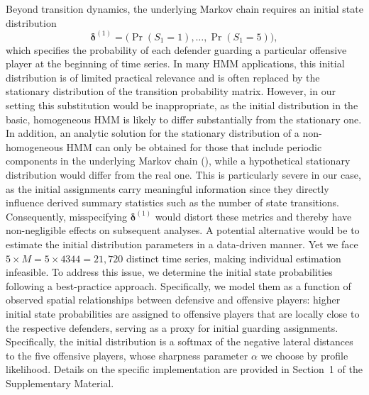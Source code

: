 \documentclass[namedate,webpdf,modern,medium]{oup-authoring-template}
\begin{document}

Beyond transition dynamics, the underlying Markov chain requires an initial state distribution 
$$\boldsymbol{\delta}^{(1)} = \bigl( \Pr(S_1=1), \ldots, \Pr(S_1=5) \bigr),$$ which specifies the probability of each defender guarding a particular offensive player at the beginning of time series. In many HMM applications, this initial distribution is of limited practical relevance and is often replaced by the stationary distribution of the transition probability matrix.
However, in our setting this substitution would be inappropriate, as the initial distribution in the basic, homogeneous HMM is likely to differ substantially from the stationary one. In addition, an analytic solution for the stationary distribution of a non-homogeneous HMM can only be obtained for those that include periodic components in the underlying Markov chain (\citealp{koslik2025inference}), while a hypothetical stationary distribution would differ from the real one. This is particularly severe in our case, as the initial assignments carry meaningful information since they directly influence derived summary statistics such as the number of state transitions. Consequently, misspecifying $\boldsymbol{\delta}^{(1)}$ would distort these metrics and thereby have non-negligible effects on subsequent analyses. 
A potential alternative would be to estimate the initial distribution parameters in a data-driven manner. Yet we face $5 \times M = 5 \times 4344 = 21{,}720$ distinct time series, making individual estimation infeasible. To address this issue, we determine the initial state probabilities following a best-practice approach. Specifically, we model them as a function of observed spatial relationships between defensive and offensive players: higher initial state probabilities are assigned to offensive players that are locally close to the respective defenders, serving as a proxy for initial guarding assignments. Specifically, the initial distribution is a softmax of the negative lateral distances to the five offensive players, whose sharpness parameter $\alpha$ we choose by profile likelihood. Details on the specific implementation are provided in Section~1 of the Supplementary Material.
\end{document}
